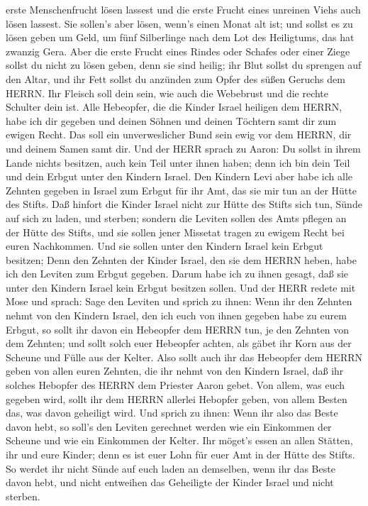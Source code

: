 erste Menschenfrucht lösen lassest und die erste Frucht eines unreinen
Viehs auch lösen lassest.  Sie sollen's aber lösen, wenn's
einen Monat alt ist; und sollst es zu lösen geben um Geld, um fünf
Silberlinge nach dem Lot des Heiligtums, das hat zwanzig Gera.
 Aber die erste Frucht eines Rindes oder Schafes oder einer
Ziege sollst du nicht zu lösen geben, denn sie sind heilig; ihr Blut
sollst du sprengen auf den Altar, und ihr Fett sollst du anzünden zum
Opfer des süßen Geruchs dem HERRN.  Ihr Fleisch soll dein
sein, wie auch die Webebrust und die rechte Schulter dein ist.
 Alle Hebeopfer, die die Kinder Israel heiligen dem HERRN,
habe ich dir gegeben und deinen Söhnen und deinen Töchtern samt dir zum
ewigen Recht. Das soll ein unverweslicher Bund sein ewig vor dem HERRN,
dir und deinem Samen samt dir.  Und der HERR sprach zu
Aaron: Du sollst in ihrem Lande nichts besitzen, auch kein Teil unter
ihnen haben; denn ich bin dein Teil und dein Erbgut unter den Kindern
Israel.  Den Kindern Levi aber habe ich alle Zehnten
gegeben in Israel zum Erbgut für ihr Amt, das sie mir tun an der Hütte
des Stifts.  Daß hinfort die Kinder Israel nicht zur Hütte
des Stifts sich tun, Sünde auf sich zu laden, und sterben; 
sondern die Leviten sollen des Amts pflegen an der Hütte des Stifts, und
sie sollen jener Missetat tragen zu ewigem Recht bei euren Nachkommen.
Und sie sollen unter den Kindern Israel kein Erbgut besitzen;
 Denn den Zehnten der Kinder Israel, den sie dem HERRN
heben, habe ich den Leviten zum Erbgut gegeben. Darum habe ich zu ihnen
gesagt, daß sie unter den Kindern Israel kein Erbgut besitzen sollen.
 Und der HERR redete mit Mose und sprach: 
Sage den Leviten und sprich zu ihnen: Wenn ihr den Zehnten nehmt von den
Kindern Israel, den ich euch von ihnen gegeben habe zu eurem Erbgut, so
sollt ihr davon ein Hebeopfer dem HERRN tun, je den Zehnten von dem
Zehnten;  und sollt solch euer Hebeopfer achten, als gäbet
ihr Korn aus der Scheune und Fülle aus der Kelter.  Also
sollt auch ihr das Hebeopfer dem HERRN geben von allen euren Zehnten,
die ihr nehmt von den Kindern Israel, daß ihr solches Hebopfer des HERRN
dem Priester Aaron gebet.  Von allem, was euch gegeben
wird, sollt ihr dem HERRN allerlei Hebopfer geben, von allem Besten das,
was davon geheiligt wird.  Und sprich zu ihnen: Wenn ihr
also das Beste davon hebt, so soll's den Leviten gerechnet werden wie
ein Einkommen der Scheune und wie ein Einkommen der Kelter.
 Ihr möget's essen an allen Stätten, ihr und eure Kinder;
denn es ist euer Lohn für euer Amt in der Hütte des Stifts.
 So werdet ihr nicht Sünde auf euch laden an demselben,
wenn ihr das Beste davon hebt, und nicht entweihen das Geheiligte der
Kinder Israel und nicht sterben.

